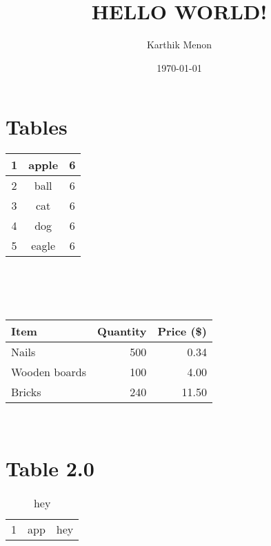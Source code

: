 \documentclass[a4paper, 12pt]{article}
\begin{document}
\title{HELLO WORLD!}
\author{Karthik Menon}
\date{\today}
\maketitle
\newpage
\section{Tables}
	\begin{tabular}{|c|c|c|}
	\hline
		1 & apple & 6 \\
		\hline
		2 & ball & 6  \\
		\hline
		3 & cat & 6  \\
		\hline
		4 & dog & 6  \\
		\hline
		5 & eagle & 6  \\
	\hline
	\end{tabular}\\
	\\ \\
	\begin{tabular}{l|r|r}
		Item & Quantity & Price (\$) \\
		\hline
		Nails & 500 & 0.34 \\
		Wooden boards & 100 & 4.00 \\
		Bricks & 240 & 11.50 \\
	\end{tabular} \\
\section{Table 2.0}
	\begin{table}[h]
		\caption{hey}
		\begin{tabular}{|c|c|c|}
			\hline
			1 & app & hey \\
		\end{tabular}
	\end{table}
\end{document}
